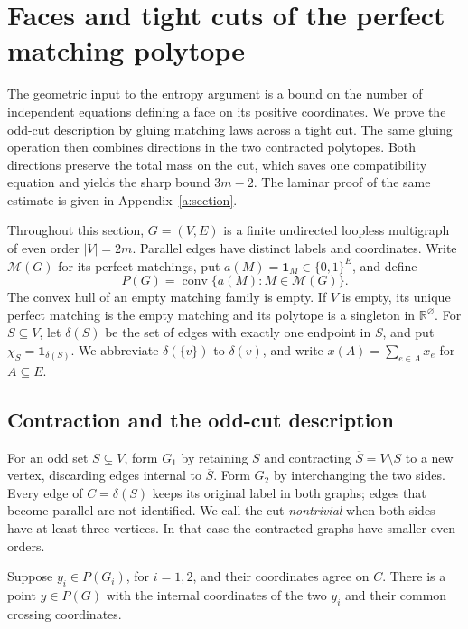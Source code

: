 \section{Faces and tight cuts of the perfect matching polytope}
\label{geom:sec-polytope}

The geometric input to the entropy argument is a bound on the number
of independent equations defining a face on its positive coordinates.
We prove the odd-cut description by gluing matching laws across a tight
cut. The same gluing operation then combines directions in the two
contracted polytopes. Both directions preserve the total mass on the cut,
which saves one compatibility equation and yields the sharp bound
$3m-2$. The laminar proof of the same estimate is given in
Appendix~\ref{a:section}.

Throughout this section, \(G=(V,E)\) is a finite undirected loopless
multigraph of even order \(|V|=2m\). Parallel edges have distinct
labels and coordinates. Write \(\mathcal M(G)\) for its perfect
matchings, put \(a(M)=\mathbf 1_M\in\{0,1\}^{E}\), and define
\[
 P(G)=\operatorname{conv}\{a(M):M\in\mathcal M(G)\}.
\]
The convex hull of an empty matching family is empty. If \(V\) is
empty, its unique perfect matching is the empty matching and its
polytope is a singleton in \(\mathbb R^\varnothing\).
For \(S\subseteq V\), let \(\delta(S)\) be the set of edges with
exactly one endpoint in \(S\), and put
\(\chi_S=\mathbf 1_{\delta(S)}\).
We abbreviate \(\delta(\{v\})\) to \(\delta(v)\), and write
\(x(A)=\sum_{e\in A}x_e\) for \(A\subseteq E\).

\subsection{Contraction and the odd-cut description}

For an odd set $S\subsetneq V$, form $G_1$ by retaining $S$ and
contracting $\overline S=V\setminus S$ to a new vertex, discarding edges
internal to $\overline S$. Form $G_2$ by interchanging the two sides.
Every edge of $C=\delta(S)$ keeps its original label in both graphs;
edges that become parallel are not identified. We call the cut
\emph{nontrivial} when both sides have at least three vertices. In that
case the contracted graphs have smaller even orders.

\begin{lemma}
\label{geom:lem-gluing}\label{a:lem-tight-cut-gluing}
Suppose $y_i\in P(G_i)$, for $i=1,2$, and their coordinates agree on
$C$. There is a point $y\in P(G)$ with the internal coordinates of the
two $y_i$ and their common crossing coordinates.
\end{lemma}

